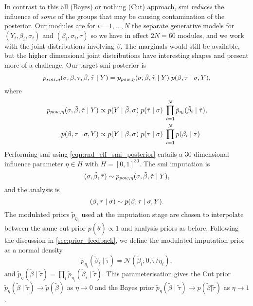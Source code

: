 In contrast to this all (Bayes) or nothing (Cut) approach, \acrshort*{smi} \emph{reduces} the influence of \emph{some} of the groups that may be causing contamination of the posterior.
Our modules are for $i=1,...,N$ the separate generative models for $(Y_i,\beta_i,\sigma_i)$ and $(\beta_i,\sigma_i,\tau)$ so we have in effect $2N=60$ modules, and we work with the joint distributions involving $\beta$. The marginals would still be available, but the higher dimensional joint distributions have interesting shapes and present more of a challenge.
Our target \acrshort*{smi} posterior is
\begin{equation}\label{eqn:rnd_eff_smi_posterior}
  p_{smi, {}{\eta}}({}{\sigma}, {}{\beta}, \tau, {}{\tilde\beta}, \tilde\tau \mid Y) = p_{pow, {}{\eta}}({}{\sigma}, {}{\tilde\beta}, \tilde\tau \mid Y) \; p({}{\beta}, \tau \mid {}{\sigma}, Y),
\end{equation}
where
\begin{align}
  p_{pow, {}{\eta}}({}{\sigma}, {}{\tilde\beta}, \tilde\tau \mid Y) & \propto p(Y \mid {}{\tilde\beta}, {}{\sigma} ) \; p(\tilde\tau \mid {}{\sigma}) \; \prod_{i=1}^{N} \tilde{p}_{\eta_i}(\tilde\beta_i \mid \tilde\tau), \\
  p({}{\beta}, \tau \mid {}{\sigma}, Y)                               & \propto p(Y \mid {}{\beta}, {}{\sigma} ) \; p(\tau \mid {}{\sigma}) \; \prod_{i=1}^{N} p(\beta_i \mid \tau)
\end{align}
Performing \acrlong*{smi} using \cref{eqn:rnd_eff_smi_posterior} entails a 30-dimensional influence parameter $\eta \in H$ with $H= [0,1]^{30}$.
The \acrshort*{smi} imputation is
\[
  (\sigma,\tilde\beta,\tilde\tau)\sim p_{pow, {}{\eta}}({}{\sigma}, {}{\tilde\beta}, \tilde\tau \mid Y),
\]
and the analysis is
\[
  ({}{\beta}, \tau \mid {}{\sigma})\sim p({}{\beta}, \tau \mid {}{\sigma}, Y).
\]
The modulated priors $\tilde{p}_{\eta_i}$ used at the imputation stage are chosen to interpolate between the same cut prior $\tilde p(\tilde\theta)\propto 1$ and analysis priors as before. Following the discussion in \cref{sec:prior_feedback}, we define the modulated imputation prior as a normal density
\[
  \tilde{p}_{\eta_i}(\tilde\beta_i \mid \tilde\tau) = \mathcal{N}(\tilde\beta_i ; 0, \tilde\tau / \eta_i ),
\]
and $\tilde{p}_{\eta}(\tilde\beta \mid \tilde\tau)=\prod_i \tilde{p}_{\eta_i}(\tilde\beta_i \mid \tilde\tau)$. This parameterisation gives the Cut prior $\tilde{p}_{\eta}(\tilde\beta \mid \tilde\tau)\to \tilde{p}(\tilde\beta)$ as $\eta\to 0$ and the Bayes prior $\tilde{p}_{\eta}(\tilde\beta \mid \tilde\tau)\to p(\tilde\beta|\tilde\tau)$ as $\eta\to 1$.

